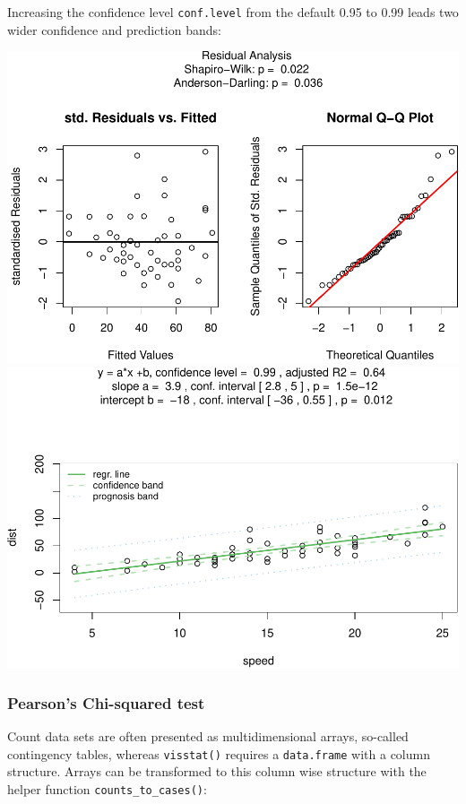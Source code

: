 \documentclass[
]{article}
\begin{document}
Increasing the confidence level \texttt{conf.level} from the default
0.95 to 0.99 leads two wider confidence and prediction bands:

\includegraphics[width=1\linewidth]{man/figures/README-pressure-1}
\includegraphics[width=1\linewidth]{man/figures/README-pressure-2}

\hypertarget{pearsons-chi-squared-test}{%
\subsubsection{Pearson's Chi-squared
test}\label{pearsons-chi-squared-test}}

Count data sets are often presented as multidimensional arrays,
so-called contingency tables, whereas \texttt{visstat()} requires a
\texttt{data.frame} with a column structure. Arrays can be transformed
to this column wise structure with the helper function
\texttt{counts\_to\_cases()}:
\end{document}
